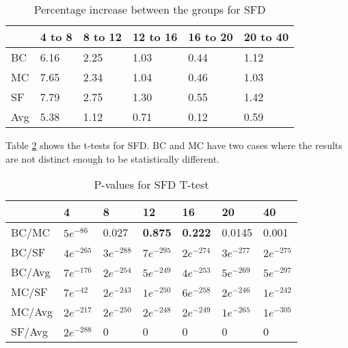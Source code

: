 \begin{table}[H]
	\centering
	\begin{tabular}{|l|lllll|}\hline
		& 4 to 8 & 8 to 12 & 12 to 16 & 16 to 20 & 20 to 40 \\ \hline
		BC 	& 6.16	& 2.25	& 1.03	& 0.44	& 1.12 \\
		MC  & 7.65	& 2.34	& 1.04	& 0.46	& 1.03 \\
		SF  & 7.79	& 2.75	& 1.30	& 0.55	& 1.42 \\
		Avg	& 5.38	& 1.12	& 0.71	& 0.12	& 0.59 \\ \hline
	\end{tabular}
	\caption{Percentage increase between the groups for SFD}
	\label{tbl:sfd}
\end{table}

Table \ref{tbl:sfd_ttest} shows the t-tests for SFD. BC and MC have two cases where the results are not distinct enough to be statistically different.

\begin{table}[H]
	\centering
	\begin{tabular}{|l|llllll|}\hline
		& 4 & 8 & 12 & 16 & 20 & 40 \\\hline
		BC/MC	& $5e^{-86}$	& 0.027	& \textbf{0.875}	& \textbf{0.222}	& 0.0145 & 0.001 \\
		BC/SF	& $4e^{-265}$	& $3e^{-288}$	& $7e^{-295}$	& $2e^{-274}$	& $3e^{-277}$ & $2e^{-275}$ \\
		BC/Avg	& $7e^{-176}$	& $2e^{-254}$	& $5e^{-249}$	& $4e^{-253}$	& $5e^{-269}$ & $5e^{-297}$ \\
		MC/SF	& $7e^{-42}$	& $2e^{-243}$ 	& $1e^{-250}$	& $6e^{-258}$	& $2e^{-246}$ & $1e^{-242}$ \\
		MC/Avg	& $2e^{-217}$	& $2e^{-250}$ 	& $2e^{-248}$	& $2e^{-249}$	& $1e^{-265}$ & $1e^{-305}$ \\
		SF/Avg	& $2e^{-288}$	& 0	& 0	& 0	& 0 & 0 \\ \hline
	\end{tabular}
	\caption{P-values for SFD T-test}
	\label{tbl:sfd_ttest}
\end{table}